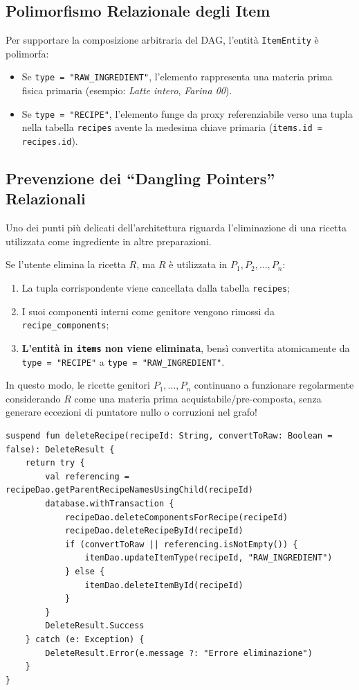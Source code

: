 \documentclass[11pt,a4paper,titlepage]{article}
\begin{document}
\subsection{Polimorfismo Relazionale degli Item}
Per supportare la composizione arbitraria del DAG, l'entit\`a \texttt{ItemEntity} \`e polimorfa:
\begin{itemize}[leftmargin=*]
    \item Se \texttt{type = "RAW\_INGREDIENT"}, l'elemento rappresenta una materia prima fisica primaria (esempio: \textit{Latte intero}, \textit{Farina 00}).
    \item Se \texttt{type = "RECIPE"}, l'elemento funge da proxy referenziabile verso una tupla nella tabella \texttt{recipes} avente la medesima chiave primaria (\texttt{items.id = recipes.id}).
\end{itemize}

\subsection{Prevenzione dei ``Dangling Pointers'' Relazionali}
Uno dei punti pi\`u delicati dell'architettura riguarda l'eliminazione di una ricetta utilizzata come ingrediente in altre preparazioni.
\begin{secbox}
Se l'utente elimina la ricetta $R$, ma $R$ \`e utilizzata in $P_1, P_2, \dots, P_n$:
\begin{enumerate}
    \item La tupla corrispondente viene cancellata dalla tabella \texttt{recipes};
    \item I suoi componenti interni come genitore vengono rimossi da \texttt{recipe\_components};
    \item \textbf{L'entit\`a in \texttt{items} non viene eliminata}, bens\`i convertita atomicamente da \texttt{type = "RECIPE"} a \texttt{type = "RAW\_INGREDIENT"}.
\end{enumerate}
In questo modo, le ricette genitori $P_1, \dots, P_n$ continuano a funzionare regolarmente considerando $R$ come una materia prima acquistabile/pre-composta, senza generare eccezioni di puntatore nullo o corruzioni nel grafo!
\end{secbox}

\begin{lstlisting}[caption={Transazione atomica di eliminazione con conversione in RecipeRepository}]
suspend fun deleteRecipe(recipeId: String, convertToRaw: Boolean = false): DeleteResult {
    return try {
        val referencing = recipeDao.getParentRecipeNamesUsingChild(recipeId)
        database.withTransaction {
            recipeDao.deleteComponentsForRecipe(recipeId)
            recipeDao.deleteRecipeById(recipeId)
            if (convertToRaw || referencing.isNotEmpty()) {
                itemDao.updateItemType(recipeId, "RAW_INGREDIENT")
            } else {
                itemDao.deleteItemById(recipeId)
            }
        }
        DeleteResult.Success
    } catch (e: Exception) {
        DeleteResult.Error(e.message ?: "Errore eliminazione")
    }
}
\end{lstlisting}
\end{document}
